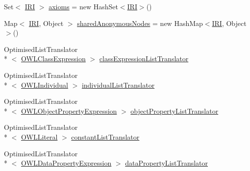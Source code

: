 \begin{DoxyCompactItemize}
\item 
Set$<$ \hyperlink{classorg_1_1semanticweb_1_1owlapi_1_1model_1_1_i_r_i}{I\-R\-I} $>$ \hyperlink{classorg_1_1coode_1_1owlapi_1_1rdfxml_1_1parser_1_1_o_w_l_r_d_f_consumer_a9642e76107bdb8b95143e343d0122daa}{axioms} = new Hash\-Set$<$\hyperlink{classorg_1_1semanticweb_1_1owlapi_1_1model_1_1_i_r_i}{I\-R\-I}$>$()
\item 
Map$<$ \hyperlink{classorg_1_1semanticweb_1_1owlapi_1_1model_1_1_i_r_i}{I\-R\-I}, Object $>$ \hyperlink{classorg_1_1coode_1_1owlapi_1_1rdfxml_1_1parser_1_1_o_w_l_r_d_f_consumer_a4d41655c8230fe6c197f2d06adabca10}{shared\-Anonymous\-Nodes} = new Hash\-Map$<$\hyperlink{classorg_1_1semanticweb_1_1owlapi_1_1model_1_1_i_r_i}{I\-R\-I}, Object$>$()
\item 
Optimised\-List\-Translator\\*
$<$ \hyperlink{interfaceorg_1_1semanticweb_1_1owlapi_1_1model_1_1_o_w_l_class_expression}{O\-W\-L\-Class\-Expression} $>$ \hyperlink{classorg_1_1coode_1_1owlapi_1_1rdfxml_1_1parser_1_1_o_w_l_r_d_f_consumer_a1600310468bb22bebbc8cc383d9c8a80}{class\-Expression\-List\-Translator}
\item 
Optimised\-List\-Translator\\*
$<$ \hyperlink{interfaceorg_1_1semanticweb_1_1owlapi_1_1model_1_1_o_w_l_individual}{O\-W\-L\-Individual} $>$ \hyperlink{classorg_1_1coode_1_1owlapi_1_1rdfxml_1_1parser_1_1_o_w_l_r_d_f_consumer_a3a13c0664eb64e52c36afc3787961b8c}{individual\-List\-Translator}
\item 
Optimised\-List\-Translator\\*
$<$ \hyperlink{interfaceorg_1_1semanticweb_1_1owlapi_1_1model_1_1_o_w_l_object_property_expression}{O\-W\-L\-Object\-Property\-Expression} $>$ \hyperlink{classorg_1_1coode_1_1owlapi_1_1rdfxml_1_1parser_1_1_o_w_l_r_d_f_consumer_a859b4a8a8d71e039125a3c7f7b85652f}{object\-Property\-List\-Translator}
\item 
Optimised\-List\-Translator\\*
$<$ \hyperlink{interfaceorg_1_1semanticweb_1_1owlapi_1_1model_1_1_o_w_l_literal}{O\-W\-L\-Literal} $>$ \hyperlink{classorg_1_1coode_1_1owlapi_1_1rdfxml_1_1parser_1_1_o_w_l_r_d_f_consumer_a55cc32cfd731d57966655dd3807f6882}{constant\-List\-Translator}
\item 
Optimised\-List\-Translator\\*
$<$ \hyperlink{interfaceorg_1_1semanticweb_1_1owlapi_1_1model_1_1_o_w_l_data_property_expression}{O\-W\-L\-Data\-Property\-Expression} $>$ \hyperlink{classorg_1_1coode_1_1owlapi_1_1rdfxml_1_1parser_1_1_o_w_l_r_d_f_consumer_a2316e668b863d8bcc44a2ab280c9f654}{data\-Property\-List\-Translator}

\end{DoxyCompactItemize}
